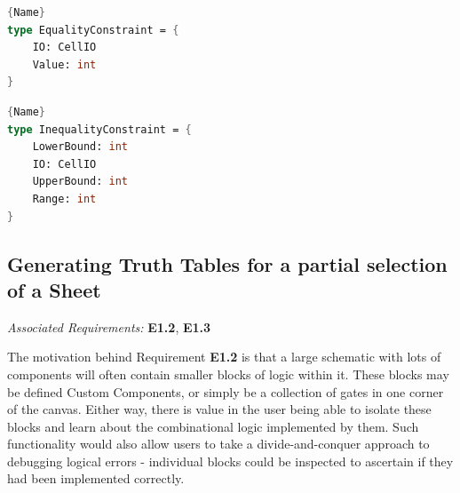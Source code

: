 \begin{center}
\noindent\begin{minipage}{.45\textwidth}
\begin{lstlisting}[caption=Definition for Equality Constraint,frame=tlrb, language=FSharp, label=lst:equalitycon]{Name}
type EqualityConstraint = {
    IO: CellIO
    Value: int
}
\end{lstlisting}
\end{minipage}\hfill
\begin{minipage}{.45\textwidth}
\begin{lstlisting}[caption=Definition for Inequality Constraint,frame=tlrb, language=FSharp, label=lst:inequalitycon]{Name}
type InequalityConstraint = {
    LowerBound: int
    IO: CellIO
    UpperBound: int
    Range: int
}
\end{lstlisting} 
\end{minipage}
\end{center}




\newpage %

\subsection{Generating Truth Tables for a partial selection of a Sheet}
\emph{Associated Requirements:} \textbf{E1.2}, \textbf{E1.3}

The motivation behind Requirement \textbf{E1.2} is that a large schematic with lots of components will often contain smaller blocks of logic within it. These blocks may be defined Custom Components, or simply be a collection of gates in one corner of the canvas. Either way, there is value in the user being able to isolate these blocks and learn about the combinational logic implemented by them. Such functionality would also allow users to take a divide-and-conquer approach to debugging logical errors - individual blocks could be inspected to ascertain if they had been implemented correctly. 

